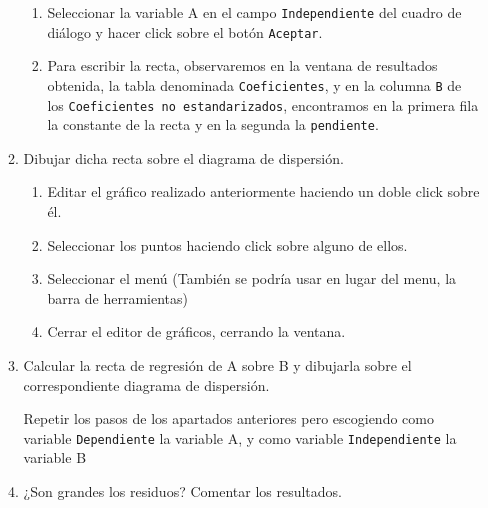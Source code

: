 \begin{enumerate}[leftmargin=*]
\begin{enumerate}
\begin{indicacion}
{\begin{enumerate}
\item Seleccionar la variable \textsf{A} en el campo
\texttt{Independiente} del cuadro de diálogo y hacer click sobre
el botón \texttt{Aceptar}.

\item Para escribir la recta, observaremos en la ventana de
resultados obtenida, la tabla denominada \texttt{Coeficientes}, y
en la columna \texttt{B} de los \texttt{Coeficientes no
estandarizados}, encontramos en la primera fila la
\textsf{constante} de la recta y en la segunda la
\texttt{pendiente}.

\end{enumerate}}
\end{indicacion}


\item Dibujar dicha recta sobre el diagrama de dispersión.

\begin{indicacion}{
\begin{enumerate}
\item Editar el gráfico realizado anteriormente haciendo un doble
click sobre él.

\item Seleccionar los puntos haciendo click sobre alguno de ellos.
\item Seleccionar el menú  (También se podría usar en lugar
del menu, la barra de herramientas) \item Cerrar el editor de
gráficos, cerrando la ventana.
\end{enumerate}}
\end{indicacion}


\item Calcular la recta de regresión de \textsf{A} sobre
\textsf{B} y dibujarla sobre el correspondiente diagrama de
dispersión.

\begin{indicacion}{
Repetir los pasos de los apartados anteriores pero escogiendo como
variable \texttt{Dependiente} la variable \textsf{A}, y como
variable \texttt{Independiente} la variable \textsf{B}}
\end{indicacion}


\item ¿Son grandes los residuos? Comentar los resultados.
\end{enumerate}



\end{enumerate}
